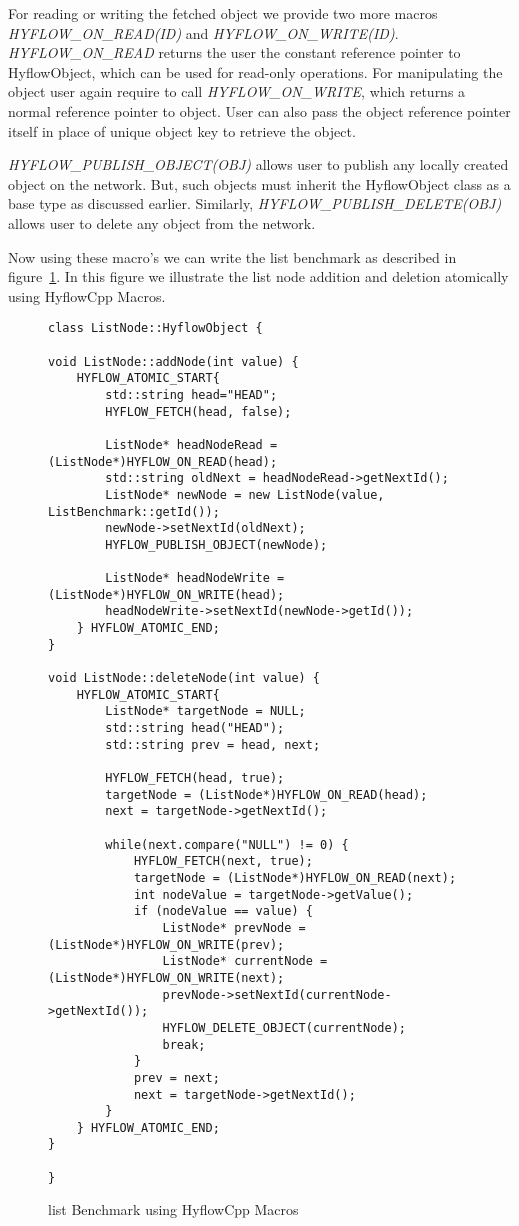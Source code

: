 \documentclass[12pt,english]{report}
\begin{document}
For reading or writing the fetched object we provide two more macros \emph{HYFLOW{\_}ON{\_}READ(ID)} and \emph{HYFLOW{\_}ON{\_}WRITE(ID)}. \emph{HYFLOW{\_}ON{\_}READ} returns the user the constant reference pointer to HyflowObject, which can be used for read-only operations. For manipulating the object user again require to call \emph{HYFLOW{\_}ON{\_}WRITE}, which returns a normal reference pointer to object. User can also pass the object reference pointer itself in place of unique object key to retrieve the object.   

\emph{HYFLOW{\_}PUBLISH{\_}OBJECT(OBJ)} allows user to publish any locally created object on the network. But, such objects must inherit the HyflowObject class as a base type as discussed earlier. Similarly, \emph{HYFLOW{\_}PUBLISH{\_}DELETE(OBJ)} allows user to delete any object from the network.

Now using these macro's we can write the list benchmark as described in figure~\ref{Fig:listMacro}. In this figure we illustrate the list node addition and deletion atomically using HyflowCpp Macros. 
\begin{figure}
\centering
\begin{lstlisting}
class ListNode::HyflowObject {

void ListNode::addNode(int value) {
	HYFLOW_ATOMIC_START{
		std::string head="HEAD";
		HYFLOW_FETCH(head, false);

		ListNode* headNodeRead =  (ListNode*)HYFLOW_ON_READ(head);
		std::string oldNext = headNodeRead->getNextId();
		ListNode* newNode = new ListNode(value, ListBenchmark::getId());
		newNode->setNextId(oldNext);
		HYFLOW_PUBLISH_OBJECT(newNode);

		ListNode* headNodeWrite = (ListNode*)HYFLOW_ON_WRITE(head);
		headNodeWrite->setNextId(newNode->getId());
	} HYFLOW_ATOMIC_END;
}

void ListNode::deleteNode(int value) {
	HYFLOW_ATOMIC_START{
		ListNode* targetNode = NULL;
		std::string head("HEAD");
		std::string prev = head, next;

		HYFLOW_FETCH(head, true);
		targetNode = (ListNode*)HYFLOW_ON_READ(head);
		next = targetNode->getNextId();

		while(next.compare("NULL") != 0) {
			HYFLOW_FETCH(next, true);
			targetNode = (ListNode*)HYFLOW_ON_READ(next);
			int nodeValue = targetNode->getValue();
			if (nodeValue == value) {
				ListNode* prevNode = (ListNode*)HYFLOW_ON_WRITE(prev);
				ListNode* currentNode = (ListNode*)HYFLOW_ON_WRITE(next);
				prevNode->setNextId(currentNode->getNextId());
				HYFLOW_DELETE_OBJECT(currentNode);
				break;
			}
			prev = next;
			next = targetNode->getNextId();
		}
	} HYFLOW_ATOMIC_END;
}

}
\end{lstlisting}
\caption{list Benchmark using HyflowCpp Macros}
\label{Fig:listMacro}
\end{figure}
\end{document}
